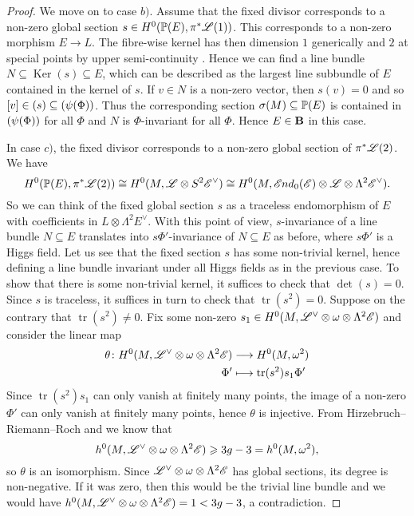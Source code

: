 \documentclass[A4paper, 12pt, british, reqno]{amsart}
\DeclareMathOperator{\tr}{tr}
\let\div\relax
\DeclareMathOperator{\div}{div}
\DeclareMathOperator{\Ker}{Ker}
\newcommand{\ot}{\otimes}
\newcommand{\dual}{^{\vee}}
\begin{document}
\begin{lm}
\begin{proof}
	We move on to case $b)$.
	Assume that the fixed divisor corresponds to a non-zero global section $s\in H^{0}(\P(E),\pi^{*}\L(1))$.
	This corresponds to a non-zero morphism $E\to L$.
	The fibre-wise kernel has then dimension $1$ generically and $2$ at special points by upper semi-continuity \cite[Proposition 1.3.2]{ati89}.
	Hence we can find a line bundle $N\subseteq \Ker(s)\subseteq E$, which can be described as the largest line subbundle of $E$ contained in the kernel of $s$.
	If $v\in N$ is a non-zero vector, then $s(v)=0$ and so $[v]\in \div(s)\subseteq \div(\psi(\Phi))$.
	Thus the corresponding section $\sigma(M)\subseteq \P(E)$ is contained in $\div(\psi(\Phi))$ for all $\Phi$ and $N$ is $\Phi$-invariant for all $\Phi$.
	Hence $E\in \bfB$ in this case.

	In case $c)$, the fixed divisor corresponds to a non-zero global section of $\pi^{*}\L(2)$.
	We have
	\[ H^{0}(\P(E),\pi^{*}\L(2))\cong H^{0}(M,\L\ot S^{2}\E\dual)\cong H^{0}(M,\sEnd_{0}(\E)\ot \L\ot \Lambda^{2}\E\dual). \]
	So we can think of the fixed global section $s$ as a traceless endomorphism of $E$ with coefficients in $L\ot \Lambda^{2}E\dual$.
	With this point of view, $s$-invariance of a line bundle $N\subseteq E$ translates into $s\Phi'$-invariance of $N\subseteq E$ as before, where $s\Phi'$ is a Higgs field.
	Let us see that the fixed section $s$ has some non-trivial kernel, hence defining a line bundle invariant under all Higgs fields as in the previous case.
	To show that there is some non-trivial kernel, it suffices to check that $\det(s)=0$.
	Since $s$ is traceless, it suffices in turn to check that $\tr(s^{2})=0$.
	Suppose on the contrary that $\tr(s^{2})\neq 0$.
	Fix some non-zero $s_{1}\in H^{0}(M,\L\dual\ot \w\ot \Lambda^{2}\E)$ and consider the linear map
	\begin{align*}
	    \theta \colon H^{0}(M,\L\dual\ot\w\ot \Lambda^{2}\E) & \longrightarrow H^{0}(M,\w^{2}) \\
	    \Phi' & \longmapsto \tr(s^{2})s_{1}\Phi'
	\end{align*}
	Since $\tr(s^{2})s_{1}$ can only vanish at finitely many points, the image of a non-zero $\Phi'$ can only vanish at finitely many points, hence $\theta$ is injective.
	From Hirzebruch--Riemann--Roch and  we know that
	\[ h^{0}(M,\L\dual\ot\w\ot \Lambda^{2}\E)\geqslant 3g-3=h^{0}(M,\w^{2}), \]
	so $\theta$ is an isomorphism.
	Since $\L\dual\ot \w\ot \Lambda^{2}\E$ has global sections, its degree is non-negative.
	If it was zero, then this would be the trivial line bundle and we would have $h^{0}(M,\L\dual\ot\w\ot\Lambda^{2}\E)=1<3g-3$, a contradiction.

\end{proof}
\end{lm}
\end{document}
